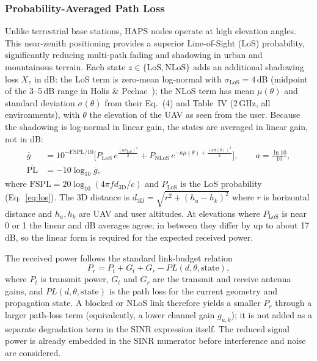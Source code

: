 \documentclass[conference]{IEEEtran}
\begin{document}
\subsubsection{Probability-Averaged Path Loss}
Unlike terrestrial base stations, HAPS nodes operate at high elevation angles. This near-zenith positioning provides a superior Line-of-Sight (LoS) probability, significantly reducing multi-path fading and shadowing in urban and mountainous terrain.
Each state $z\in\{\mathrm{LoS},\mathrm{NLoS}\}$ adds an additional shadowing loss $X_z$ in dB:
the LoS term is zero-mean log-normal with $\sigma_\mathrm{LoS}=4$\,dB (midpoint of the 3--5\,dB range in
Holis \& Pechac~\cite{holispechac2008}); the NLoS term has mean $\mu(\theta)$ and standard deviation $\sigma(\theta)$
from their Eq.~(4) and Table~IV (2\,GHz, all environments), with $\theta$ the elevation of the UAV as seen from the user.
Because the shadowing is log-normal in linear gain, the states are averaged in linear gain, not in dB:
\begin{align}
\overline{g} &= 10^{-\mathrm{FSPL}/10}\Big[P_\mathrm{LoS}\,e^{\tfrac{(a\sigma_\mathrm{LoS})^2}{2}}
              + P_\mathrm{NLoS}\,e^{-a\mu(\theta)+\tfrac{(a\sigma(\theta))^2}{2}}\Big], \qquad a=\tfrac{\ln 10}{10},\\
\overline{\mathrm{PL}} &= -10\log_{10}\overline{g},
\label{eq:pl}
\end{align}
where $\mathrm{FSPL}=20\log_{10}(4\pi f d_\mathrm{3D}/c)$ and $P_\mathrm{LoS}$ is the LoS probability (Eq.~\eqref{eq:los}).
The 3D distance is $d_\mathrm{3D}=\sqrt{r^2+(h_u-h_k)^2}$ where $r$ is horizontal distance and $h_u, h_k$ are UAV and user altitudes.
At elevations where $P_\mathrm{LoS}$ is near 0 or 1 the linear and dB averages agree; in between they differ by up to about 17\,dB,
so the linear form is required for the expected received power.

The received power follows the standard link-budget relation
\begin{equation}
P_r = P_t + G_t + G_r - PL(d,\theta,\mathrm{state}),
\label{eq:rx-power}
\end{equation}
where $P_t$ is transmit power, $G_t$ and $G_r$ are the transmit and receive antenna gains, and $PL(d,\theta,\mathrm{state})$ is the path loss for the current geometry and propagation state. A blocked or NLoS link therefore yields a smaller $P_r$ through a larger path-loss term (equivalently, a lower channel gain $g_{u,k}$); it is not added as a separate degradation term in the SINR expression itself. The reduced signal power is already embedded in the SINR numerator before interference and noise are considered.
\end{document}
